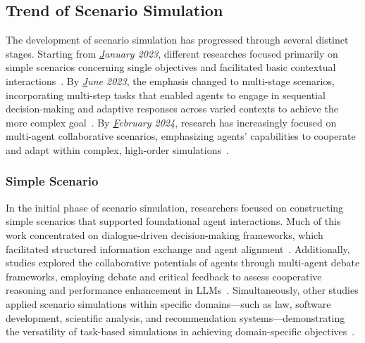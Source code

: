 \subsection{Trend of Scenario Simulation}
The development of scenario simulation has progressed through several distinct stages. 
Starting from \textit{{\ul January 2023}}, different researches focused primarily on simple scenarios concerning single objectives and facilitated basic contextual interactions~\cite{nair2023dera,li2023camel,hamilton2023blind,xiong2023examining}.
By \textit{{\ul June 2023}}, the emphasis changed to multi-stage scenarios, incorporating multi-step tasks that enabled agents to engage in sequential decision-making and adaptive responses across varied contexts to achieve the more complex goal~\cite{talebirad2023multi,mandi2024roco,li2023tradinggpt,hassan2023chatgpt}.
By \textit{{\ul February 2024}}, research has increasingly focused on multi-agent collaborative scenarios, emphasizing agents' capabilities to cooperate and adapt within complex, high-order simulations~\cite{yu2024affordable,chen2024s,ma2024debate,yue2024mathvc}.

\subsubsection{Simple Scenario}
In the initial phase of scenario simulation, researchers focused on constructing simple scenarios that supported foundational agent interactions. Much of this work concentrated on dialogue-driven decision-making frameworks, which facilitated structured information exchange and agent alignment~\cite{nair2023dera,li2023camel,hao2023chatllm}. Additionally, studies explored the collaborative potentials of agents through multi-agent debate frameworks, employing debate and critical feedback to assess cooperative reasoning and performance enhancement in LLMs~\cite{fu2023improving,xiong2023examining,du2023improving}. Simultaneously, other studies applied scenario simulations within specific domains—such as law, software development, scientific analysis, and recommendation systems—demonstrating the versatility of task-based simulations in achieving domain-specific objectives~\cite{hamilton2023blind,dong2023self,zhu2023ghost}.

